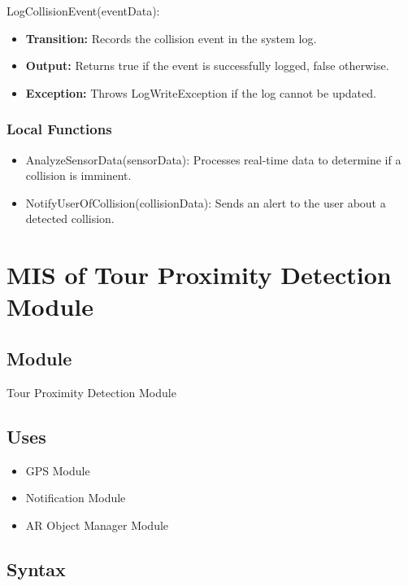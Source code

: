 \documentclass[12pt, titlepage]{article}
\begin{document}
\noindent LogCollisionEvent(eventData):
\begin{itemize}
  \item \textbf{Transition:} Records the collision event in the system log.
  \item \textbf{Output:} Returns true if the event is successfully logged, false otherwise.
  \item \textbf{Exception:} Throws LogWriteException if the log cannot be updated.
\end{itemize}

\subsubsection{Local Functions}

\begin{itemize}
  \item AnalyzeSensorData(sensorData): Processes real-time data to determine if a collision is imminent.
  \item NotifyUserOfCollision(collisionData): Sends an alert to the user about a detected collision.
\end{itemize}

\newpage

\section{MIS of Tour Proximity Detection Module} \label{Module_TourProximityDetection}

\subsection{Module}

Tour Proximity Detection Module

\subsection{Uses}

\begin{itemize}
  \item GPS Module
  \item Notification Module
  \item AR Object Manager Module
\end{itemize}

\subsection{Syntax}
\end{document}
